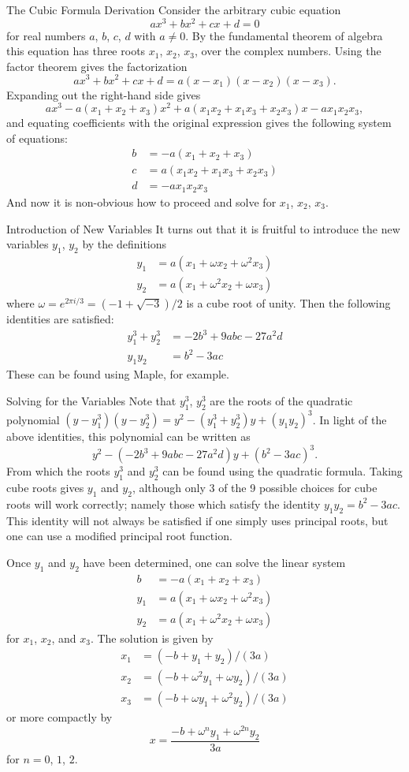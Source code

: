 \documentclass{article}
\begin{document}
The Cubic Formula Derivation
Consider the arbitrary cubic equation \[ ax^3 + bx^2 + cx + d = 0 \] for real numbers $a$, $b$, $c$, $d$ with $a\neq0$. By the fundamental theorem of algebra this equation has three roots $x_1$, $x_2$, $x_3$, over the complex numbers. Using the factor theorem gives the factorization \[ ax^3 + bx^2 + cx + d = a(x-x_1)(x-x_2)(x-x_3) . \] Expanding out the right-hand side gives \[ ax^3 - a(x_1+x_2+x_3)x^2 + a(x_1x_2+x_1x_3+x_2x_3)x - ax_1x_2x_3 , \] and equating coefficients with the original expression gives the following system of equations: \begin{align*} b &= - a(x_1+x_2+x_3) \\ c &= a(x_1x_2+x_1x_3+x_2x_3) \\ d &= - ax_1x_2x_3 \end{align*} And now it is non-obvious how to proceed and solve for $x_1$, $x_2$, $x_3$.

Introduction of New Variables
It turns out that it is fruitful to introduce the new variables $y_1$, $y_2$ by the definitions \begin{align*} y_1 &= a(x_1+\omega x_2+\omega^2 x_3) \\ y_2 &= a(x_1+\omega^2 x_2+\omega x_3) \end{align*} where $\omega=e^{2\pi i/3}=(-1+\sqrt{-3})/2$ is a cube root of unity. Then the following identities are satisfied: \begin{align*} y_1^3+y_2^3 &= -2b^3 + 9abc - 27a^2d \\ y_1y_2 &= b^2 - 3ac \end{align*} These can be found using Maple, for example.

Solving for the Variables
Note that $y_1^3$, $y_2^3$ are the roots of the quadratic polynomial $(y-y_1^3)(y-y_2^3)=y^2-(y_1^3+y_2^3)y+(y_1y_2)^3$. In light of the above identities, this polynomial can be written as \[ y^2 - (-2b^3+9abc-27a^2d)y + (b^2-3ac)^3 . \] From which the roots $y_1^3$ and $y_2^3$ can be found using the quadratic formula. Taking cube roots gives $y_1$ and $y_2$, although only 3 of the 9 possible choices for cube roots will work correctly; namely those which satisfy the identity $y_1y_2 = b^2 - 3ac$. This identity will not always be satisfied if one simply uses principal roots, but one can use a modified principal root function.

Once $y_1$ and $y_2$ have been determined, one can solve the linear system \begin{align*} b &= - a(x_1+x_2+x_3) \\ y_1 &= a(x_1+\omega x_2+\omega^2 x_3) \\ y_2 &= a(x_1+\omega^2 x_2+\omega x_3) \end{align*} for $x_1$, $x_2$, and $x_3$. The solution is given by \begin{align*} x_1 &= (-b+y_1+y_2)/(3a) \\ x_2 &= (-b+\omega^2 y_1+\omega y_2)/(3a) \\ x_3 &= (-b+\omega y_1+\omega^2 y_2)/(3a) \end{align*} or more compactly by \[ x = \frac{-b+\omega^n y_1+\omega^{2n} y_2}{3a} \] for $n=0$, $1$, $2$.
\end{document}
